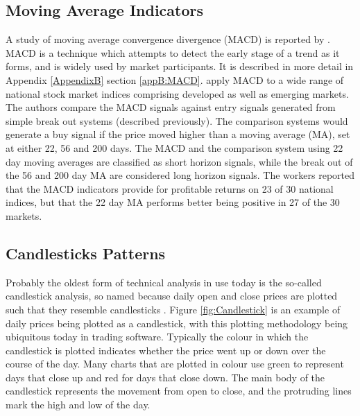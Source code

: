 \subsection{Moving Average Indicators}
A study of moving average convergence divergence (MACD) is reported by \cite{Prodan2013214}. MACD is a technique which attempts to detect the early stage of a trend as it forms, and is widely used by market participants. It is described in more detail in Appendix \ref{AppendixB} section \ref{appB:MACD}. \cite{Prodan2013214} apply MACD to a wide range of national stock market indices comprising developed as well as emerging markets. The authors compare the MACD signals against entry signals generated from simple break out systems (described previously). The comparison systems would generate a buy signal if the price moved higher than a moving average (MA), set at either 22, 56 and 200 days. The MACD and the comparison system using 22 day moving averages are classified as short horizon signals, while the break out of the 56 and 200 day MA are considered long horizon signals. The workers reported that the MACD indicators provide for profitable returns on 23 of 30 national indices, but that the 22 day MA performs better being positive in 27 of the 30 markets.

%
%

\subsection{Candlesticks Patterns}
\label{sec:candlesticks}
Probably the oldest form of technical analysis in use today is the so-called candlestick analysis, so named because daily open and close prices are plotted such that they resemble candlesticks \citep{morris2006candlestick}. Figure \ref{fig:Candlestick} is an example of daily prices being plotted as a candlestick, with this plotting methodology being ubiquitous today in trading software. Typically the colour in which the candlestick is plotted indicates whether the price went up or down over the course of the day. Many charts that are plotted in colour use green to represent days that close up and red for days that close down. The main body of the candlestick represents the movement from open to close, and the protruding lines mark the high and low of the day.

